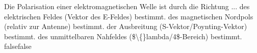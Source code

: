     {Die Polarisation einer elektromagnetischen Welle ist durch die Richtung ...}
    {des elektrischen Feldes (Vektor des E-Feldes) bestimmt.}
    {des magnetischen Nordpols (relativ zur Antenne) bestimmt.}
    {der Ausbreitung (S-Vektor/Poynting-Vektor) bestimmt.}
    {des unmittelbaren Nahfeldes (\$\textbackslash\{\}lambda/4\$-Bereich) bestimmt.}
    {false}{false}